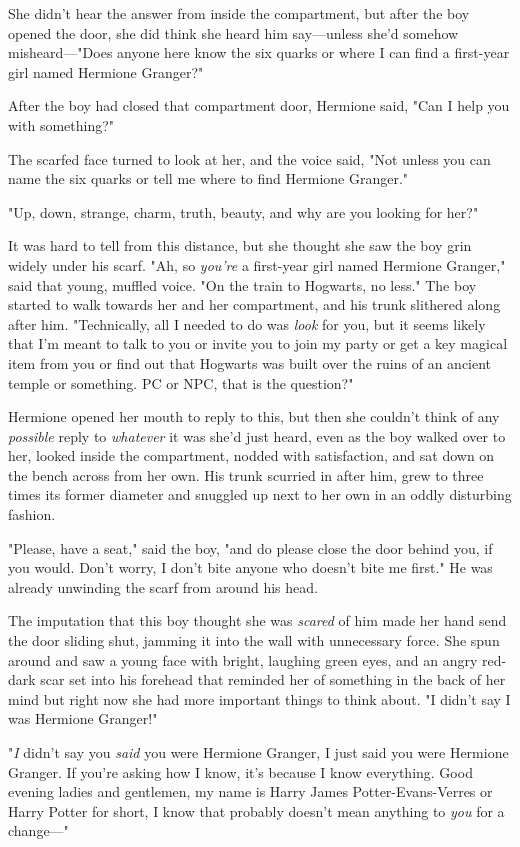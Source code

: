 She didn't hear the answer from inside the compartment, but after the boy
opened the door, she did think she heard him say—unless she'd somehow
misheard—"Does anyone here know the six quarks or where I can find a
first-year girl named Hermione Granger?"

After the boy had closed that compartment door, Hermione said, "Can I help you
with something?"

The scarfed face turned to look at her, and the voice said, "Not unless you can
name the six quarks or tell me where to find Hermione Granger."

"Up, down, strange, charm, truth, beauty, and why are you looking for her?"

It was hard to tell from this distance, but she thought she saw the boy grin
widely under his scarf. "Ah, so \emph{you're} a first-year girl named Hermione
Granger," said that young, muffled voice. "On the train to Hogwarts, no less."
The boy started to walk towards her and her compartment, and his trunk
slithered along after him. "Technically, all I needed to do was \emph{look} for
you, but it seems likely that I'm meant to talk to you or invite you to join my
party or get a key magical item from you or find out that Hogwarts was built
over the ruins of an ancient temple or something. PC or NPC, that is the
question?"

Hermione opened her mouth to reply to this, but then she couldn't think of any
\emph{possible} reply to{\el} \emph{whatever} it was she'd just heard, even
as the boy walked over to her, looked inside the compartment, nodded with
satisfaction, and sat down on the bench across from her own. His trunk scurried
in after him, grew to three times its former diameter and snuggled up next to
her own in an oddly disturbing fashion.

"Please, have a seat," said the boy, "and do please close the door behind you,
if you would. Don't worry, I don't bite anyone who doesn't bite me first." He
was already unwinding the scarf from around his head.

The imputation that this boy thought she was \emph{scared} of him made her hand
send the door sliding shut, jamming it into the wall with unnecessary force.
She spun around and saw a young face with bright, laughing green eyes, and an
angry red-dark scar set into his forehead that reminded her of something in the
back of her mind but right now she had more important things to think about. "I
didn't say I was Hermione Granger!"

"\emph{I} didn't say you \emph{said} you were Hermione Granger, I just said you
were Hermione Granger. If you're asking how I know, it's because I know
everything. Good evening ladies and gentlemen, my name is Harry James
Potter-Evans-Verres or Harry Potter for short, I know that probably doesn't
mean anything to \emph{you} for a change—"

